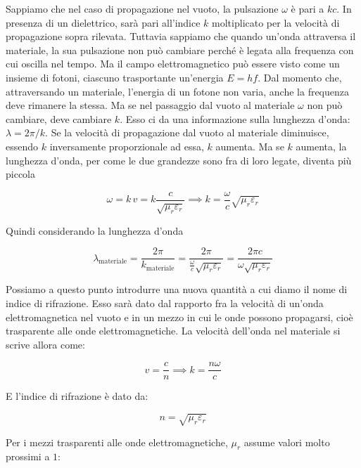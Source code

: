 \begin{figure}[htpb]
\end{figure}
\FloatBarrier

Sappiamo che nel caso di propagazione nel vuoto, la pulsazione $\omega$ è pari a $kc$. In presenza di un dielettrico, sarà pari all'indice $k$ moltiplicato per la velocità di propagazione sopra rilevata. Tuttavia sappiamo che quando un'onda attraversa il materiale, la sua pulsazione non può cambiare perché è legata alla frequenza con cui oscilla nel tempo. Ma il campo elettromagnetico può essere visto come un insieme di fotoni, ciascuno trasportante un'energia $E=hf$. Dal momento che, attraversando un materiale, l'energia di un fotone non varia, anche la frequenza deve rimanere la stessa. Ma se nel passaggio dal vuoto al materiale $\omega$ non può cambiare, deve cambiare $k$. Esso ci da una informazione sulla lunghezza d'onda: $ \lambda=2\pi /k $. Se la velocità di propagazione dal vuoto al materiale diminuisce, essendo $k$ inversamente proporzionale ad essa, $k$ aumenta. Ma se $k$ aumenta, la lunghezza d'onda, per come le due grandezze sono fra di loro legate, diventa più piccola

\[
	\omega = k\,v= k \frac{c}{\sqrt{\mu_r \varepsilon_r}} \implies \boxed{k=\frac{\omega}{c}\sqrt{\mu_r \varepsilon_r}}
\]

Quindi considerando la lunghezza d'onda

\[
	\lambda_{\text{materiale}} = \frac{2\pi}{k_{\text{materiale}}} = \frac{2\pi}{\frac{\omega}{c}\sqrt{\mu_r \varepsilon_r}} = \frac{2\pi c}{\omega \sqrt{\mu_r \varepsilon_r}}
\]

Possiamo a questo punto introdurre una nuova quantità a cui diamo il nome di indice di rifrazione. Esso sarà dato dal rapporto fra la velocità di un'onda elettromagnetica nel vuoto e in un mezzo in cui le onde possono propagarsi, cioè trasparente alle onde elettromagnetiche.
La velocità dell'onda nel materiale si scrive allora come:

\[
	v=\frac{c}{n} \implies \boxed{k=\frac{n\omega}{c}}
\]

E l'indice di rifrazione è dato da:

\[
	\boxed{n=\sqrt{\mu_r \varepsilon_r}}
\]

Per i mezzi trasparenti alle onde elettromagnetiche, $ \mu_r  $ assume valori molto prossimi a $1$:

